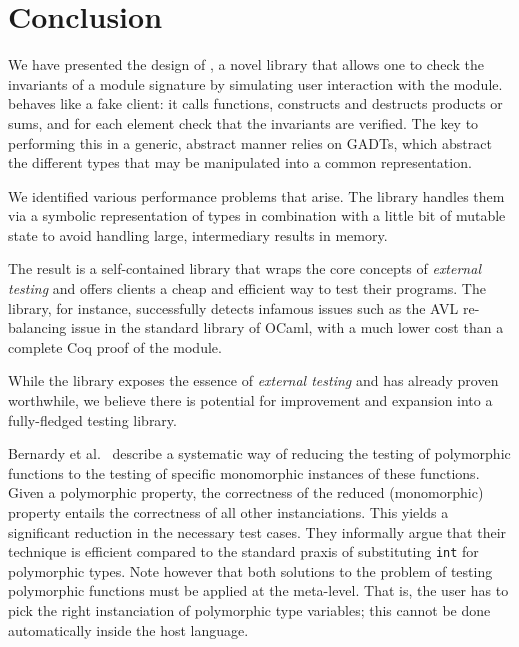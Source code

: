 \section{Conclusion}

We have presented the design of \arti, a novel library that allows one to check
the invariants of a module signature by simulating user interaction with the
module. \arti behaves like a fake client: it calls functions, constructs and
destructs products or sums, and for each element check that the invariants are
verified. The key to performing this in a generic, abstract manner relies on
GADTs, which abstract the different types that may be manipulated into a common
representation.

We identified various performance problems that arise. The library handles them
via a symbolic representation of types in combination with a little bit of
mutable state to avoid handling large, intermediary results in memory.

The result is a self-contained library that wraps the core concepts of
\emph{external testing} and offers clients a cheap and efficient way to test
their programs. The library, for instance, successfully detects infamous issues
such as the AVL re-balancing issue in the standard library of OCaml, with a much
lower cost than a complete Coq proof of the module.

While the library exposes the essence of \emph{external testing} and has already
proven worthwhile, we believe there is potential for improvement and expansion
into a fully-fledged testing library.

Bernardy et al.~\cite{DBLP:conf/esop/BernardyJC10} describe a
systematic way of reducing the testing of polymorphic functions to the
testing of specific monomorphic instances of these functions.
%
Given a polymorphic property, the correctness of the reduced
(monomorphic) property entails the correctness of all other
instanciations. This yields a significant reduction in the necessary
test cases.
%
They informally argue that their technique is efficient compared to
the standard praxis of substituting \texttt{int} for polymorphic
types.
%
Note however that both solutions to the problem of testing polymorphic
functions must be applied at the meta-level. That is, the user has to
pick the right instanciation of polymorphic type variables; this
cannot be done automatically inside the host language.
